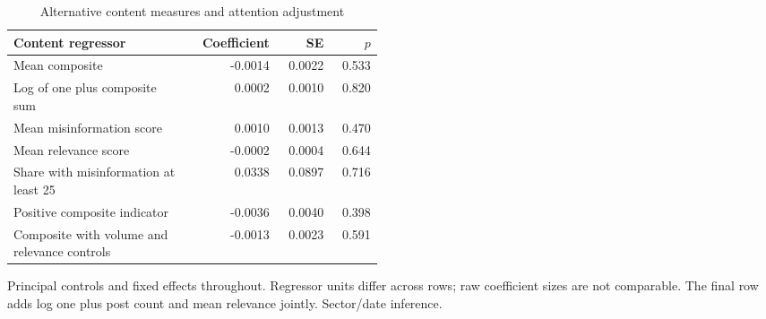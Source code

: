 \begin{table}[htbp]
\centering
\caption{Alternative content measures and attention adjustment}
\label{tab:variants}
\begin{minipage}{\linewidth}
\small
\setlength{\tabcolsep}{4pt}
\begingroup\centering
\begin{tabular}{p{0.48\linewidth}rrr}
\toprule
Content regressor & Coefficient & SE & $p$ \\
\midrule
Mean composite & -0.0014 & 0.0022 & 0.533 \\
Log of one plus composite sum & 0.0002 & 0.0010 & 0.820 \\
Mean misinformation score & 0.0010 & 0.0013 & 0.470 \\
Mean relevance score & -0.0002 & 0.0004 & 0.644 \\
Share with misinformation at least 25 & 0.0338 & 0.0897 & 0.716 \\
Positive composite indicator & -0.0036 & 0.0040 & 0.398 \\
Composite with volume and relevance controls & -0.0013 & 0.0023 & 0.591 \\
\bottomrule
\end{tabular}\par\endgroup
\par\vspace{0.5em}\footnotesize Principal controls and fixed effects throughout. Regressor units differ across rows; raw coefficient sizes are not comparable. The final row adds log one plus post count and mean relevance jointly. Sector/date inference.
\end{minipage}
\end{table}

